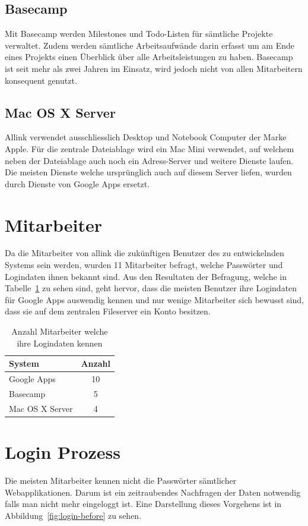 \subsection{Basecamp}
\label{subs:Basecamp}
Mit Basecamp werden Milestones und Todo-Listen für sämtliche Projekte verwaltet. Zudem werden sämtliche Arbeitsaufwände darin erfasst um am Ende eines Projekts einen Überblick über alle Arbeitsleistungen zu haben. Basecamp ist seit mehr als zwei Jahren im Einsatz, wird jedoch nicht von allen Mitarbeitern konsequent genutzt.

\subsection{Mac OS X Server}
\label{subs:Mac OS X Server}
Allink verwendet ausschliesslich Desktop und Notebook Computer der Marke Apple. Für die zentrale Dateiablage wird ein Mac Mini verwendet, auf welchem neben der Dateiablage auch noch ein Adress-Server und weitere Dienste laufen. Die meisten Dienste welche ursprünglich auch auf diesem Server liefen, wurden durch Dienste von Google Apps ersetzt.

\section{Mitarbeiter}
\label{sec:Mitarbeiter}
Da die Mitarbeiter von allink die zukünftigen Benutzer des zu entwickelnden Systems sein werden, wurden 11 Mitarbeiter befragt, welche Passwörter und Logindaten ihnen bekannt sind. Aus den Resultaten der Befragung, welche in Tabelle~\ref{tab:umfrage_passworter} zu sehen sind, geht hervor, dass die meisten Benutzer ihre Logindaten für Google Apps auswendig kennen und nur wenige Mitarbeiter sich bewusst sind, dass sie auf dem zentralen Fileserver ein Konto besitzen.

\begin{table}
  \centering
  \begin{tabular}
  	{|l | c|} \hline System & Anzahl\\
  	\hline Google Apps & 10\\
  	\hline Basecamp & 5\\
  	\hline Mac OS X Server & 4\\
  	\hline 
  \end{tabular}
  \caption{Anzahl Mitarbeiter welche ihre Logindaten kennen}
  \label{tab:umfrage_passworter}
\end{table}

\section{Login Prozess}
\label{sec:Login Prozess}
Die meisten Mitarbeiter kennen nicht die Passwörter sämtlicher Webapplikationen. Darum ist ein zeitraubendes Nachfragen der Daten notwendig falls man nicht mehr eingeloggt ist. Eine Darstellung dieses Vorgehens ist in Abbildung~\ref{fig:login-before} zu sehen.

